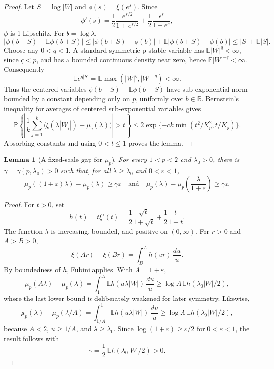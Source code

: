 \documentclass[11pt]{article}
\newtheorem{lemma}{Lemma}
\newcommand{\R}{\mathbb{R}}
\newcommand{\E}{\mathbb{E}}
\newcommand{\Prob}{\mathbb{P}}
\newcommand{\abs}[1]{\left\lvert #1\right\rvert}
\newcommand{\eps}{\varepsilon}
\begin{document}
\begin{proof}
Let \(S=\log\abs W\) and \(\phi(s)=\xi(e^s)\).  Since
\[
 \phi'(s)=
 \frac12\frac{e^{s/2}}{1+e^{s/2}}
 +\frac12\frac{e^s}{1+e^s},
\]
\(\phi\) is 1-Lipschitz.  For \(b=\log\lambda\),
\[
\abs{\phi(b+S)-\E\phi(b+S)}
\leq \abs{\phi(b+S)-\phi(b)}
     +\E\abs{\phi(b+S)-\phi(b)}
\leq \abs S+\E\abs S .
\]
Choose any \(0<q<1\).  A standard symmetric p-stable variable has
\(\E\abs W^q<\infty\), since \(q<p\), and has a bounded continuous density near
zero, hence \(\E\abs W^{-q}<\infty\).  Consequently
\[
  \E e^{q\abs S}=\E\max(\abs W^q,\abs W^{-q})<\infty .
\]
Thus the centered variables
\(\phi(b+S)-\E\phi(b+S)\) have sub-exponential norm bounded by a constant
depending only on \(p\), uniformly over \(b\in\R\).  Bernstein's inequality for
averages of centered sub-exponential variables gives
\[
\Prob\left\{\left|\frac1k\sum_{j=1}^k
\bigl(\xi(\lambda\abs{W_j})-\mu_p(\lambda)\bigr)\right|>t\right\}
\leq
2\exp\{-c k\min(t^2/K_p^2,t/K_p)\}.
\]
Absorbing constants and using \(0<t\leq1\) proves the lemma.
\end{proof}

\begin{lemma}[A fixed-scale gap for \(\mu_p\)]
\label{lem:gap}
For every \(1<p<2\) and \(\lambda_0>0\), there is
\(\gamma=\gamma(p,\lambda_0)>0\) such that, for all
\(\lambda\geq\lambda_0\) and \(0<\eps<1\),
\[
 \mu_p((1+\eps)\lambda)-\mu_p(\lambda)\geq \gamma\eps
\quad\text{and}\quad
 \mu_p(\lambda)-\mu_p\!\left(\frac{\lambda}{1+\eps}\right)\geq \gamma\eps .
\]
\end{lemma}

\begin{proof}
For \(t>0\), set
\[
  h(t)=t\xi'(t)
  =\frac12\frac{\sqrt t}{1+\sqrt t}
   +\frac12\frac{t}{1+t}.
\]
The function \(h\) is increasing, bounded, and positive on \((0,\infty)\).
For \(r>0\) and \(A>B>0\),
\[
  \xi(Ar)-\xi(Br)=\int_B^A h(ur)\,\frac{du}{u}.
\]
By boundedness of \(h\), Fubini applies.  With \(A=1+\eps\),
\[
\mu_p(A\lambda)-\mu_p(\lambda)
=\int_1^A \E h(u\lambda\abs W)\,\frac{du}{u}
\geq \log A\,\E h(\lambda_0\abs W/2),
\]
where the last lower bound is deliberately weakened for later symmetry.
Likewise,
\[
\mu_p(\lambda)-\mu_p(\lambda/A)
=\int_{1/A}^1 \E h(u\lambda\abs W)\,\frac{du}{u}
\geq \log A\,\E h(\lambda_0\abs W/2),
\]
because \(A<2\), \(u\geq 1/A\), and \(\lambda\geq\lambda_0\).  Since
\(\log(1+\eps)\geq \eps/2\) for \(0<\eps<1\), the result follows with
\[
  \gamma=\frac12\,\E h(\lambda_0\abs W/2)>0 .
\]
\end{proof}
\end{document}
